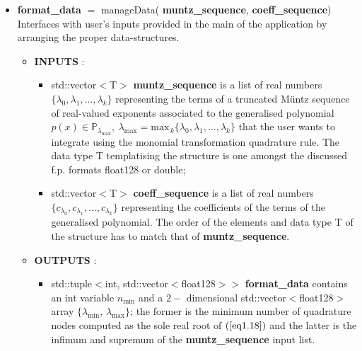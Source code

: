 \documentclass[a4paper, twosided]{book}
\begin{document}
\begin{itemize}
    \item \color{poliDarkBlue} \textbf{format\_data} \color{black} $=$ \colorbox{poliGrayBlue}{manageData}(\color{poliDarkBlue} \textbf{muntz\_sequence}\color{black}, \color{poliDarkBlue} \textbf{coeff\_sequence}\color{black})
    \newline Interfaces with user's inputs provided in the \colorbox{poliGrayBlue}{main} of the application by arranging the proper data-structures.
    \begin{itemize}
        \item \color{poliDarkBlue} \textbf{INPUTS} \color{black}:
        \begin{itemize}
            \item \colorbox{poliGrayBlue}{std::vector$<$T$>$} \color{poliDarkBlue} \textbf{muntz\_sequence} \color{black} is a list of real numbers $\{\lambda_0, \lambda_1, \dots, \lambda_k\}$ representing the terms of a truncated Müntz sequence of real-valued exponents associated to the generalised polynomial $p(x)\in\mathbb{P}_{\lambda_{\text{max}}},\:\lambda_{\text{max}}=\text{max}_{\,k}\{\lambda_0, \lambda_1, \dots, \lambda_k\}$ that the user wants to integrate using the monomial transformation quadrature rule. The data type \colorbox{poliGrayBlue}{T} templatising the structure is one amongst the discussed f.p. formats \colorbox{poliGrayBlue}{float128} or \colorbox{poliGrayBlue}{double};
            \item \colorbox{poliGrayBlue}{std::vector$<$T$>$} \color{poliDarkBlue} \textbf{coeff\_sequence} \color{black} is a list of real numbers $\{c_{\lambda_0}, c_{\lambda_1}, \dots, c_{\lambda_k}\}$ representing the coefficients of the terms of the generalised polynomial. The order of the elements and data type \colorbox{poliGrayBlue}{T} of the structure has to match that of \color{poliDarkBlue} \textbf{muntz\_sequence}\color{black}.
        \end{itemize}
        \item \color{poliDarkBlue} \textbf{OUTPUTS} \color{black}:
        \begin{itemize}
            \item \colorbox{poliGrayBlue}{std::tuple$<$int, std::vector$<$float128$>>$} \color{poliDarkBlue} \textbf{format\_data} \color{black} contains an \colorbox{poliGrayBlue}{int} variable $n_{\text{min}}$ and a $2-$ dimensional \colorbox{poliGrayBlue}{std::vector$<$float128$>$} array $\{\lambda_{\text{min}}, \,\lambda_{\text{max}}\}$; the former is the minimum number of quadrature nodes computed as the sole real root of $(\ref{eq1.18})$ and the latter is the infimum and supremum of the \color{poliDarkBlue} \textbf{muntz\_sequence} \color{black} input list.
        \end{itemize}
    \end{itemize}


\end{itemize}
\end{document}
